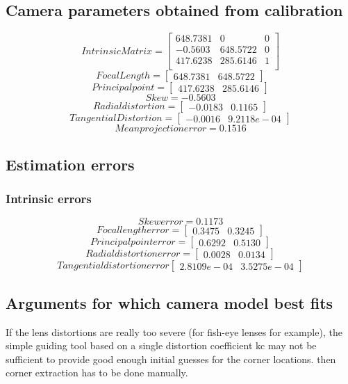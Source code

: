 \documentclass[11pt,a4paper]{article}
\begin{document}
	\subsection{Camera parameters obtained from calibration}
	\[ 
	Intrinsic Matrix =
	\begin{bmatrix}
	648.7381 & 0 & 0 \\
	-0.5603 & 648.5722 & 0 \\
	417.6238 & 285.6146 & 1 \\
	\end{bmatrix}
	\]
	\[ 
	Focal Length = 
	\begin{bmatrix}
	648.7381 & 648.5722
	\end{bmatrix}
	\]
	\[ 
	Principal point =
	\begin{bmatrix}
	417.6238 & 285.6146
	\end{bmatrix}
	\]
	\[ 
	Skew = -0.5603
	\]
	\[
	Radial distortion = 
	\begin{bmatrix}
	-0.0183 & 0.1165
	\end{bmatrix}
	\]
	\[ 
	Tangential Distortion = 
	\begin{bmatrix}
	-0.0016 & 9.2118e-04
	\end{bmatrix}
	\]
	\[ 
	Mean projection error = 0.1516
	\]
	\subsection{Estimation errors}
	\subsubsection{Intrinsic errors}
	\[
	Skew error = 0.1173
	\]
	\[
	Focal length error = 
	\begin{bmatrix}
	0.3475 & 0.3245
	\end{bmatrix}
	\]
	\[
	Principal point error = 
	\begin{bmatrix}
	0.6292 & 0.5130
	\end{bmatrix}
	\]
	\[
	Radial distortion error = 
	\begin{bmatrix}
	0.0028 & 0.0134
	\end{bmatrix}
	\]
	\[
	Tangential distortion error
	\begin{bmatrix}
	2.8109e-04 & 3.5275e-04
	\end{bmatrix}
	\]
	
	
	\subsection{Arguments for which camera model best fits} 
	If the lens distortions are really too severe (for fish-eye lenses for example), the simple guiding tool based on a single distortion coefficient kc may not be sufficient to provide good enough initial guesses for the corner locations. then corner extraction has to be done manually.
	
\end{document}
